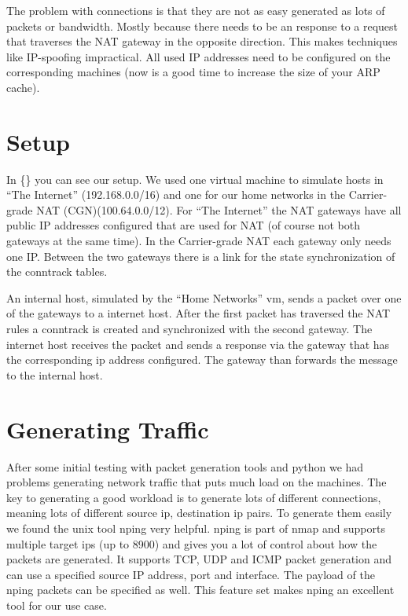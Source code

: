 \documentclass{report}
\begin{document}
The problem with connections is that they are not as easy generated as
lots of packets or bandwidth. Mostly because there needs to be an
response to a request that traverses the NAT gateway in the opposite
direction. This makes techniques like IP-spoofing impractical. All used
IP addresses need to be configured on the corresponding machines (now is
a good time to increase the size of your ARP cache).

\section{Setup}\label{setup-1}

In \{\} you can see our setup. We used one virtual machine to simulate
hosts in ``The Internet'' (192.168.0.0/16) and one for our home networks
in the Carrier-grade NAT (CGN)(100.64.0.0/12). For ``The Internet'' the
NAT gateways have all public IP addresses configured that are used for
NAT (of course not both gateways at the same time). In the Carrier-grade
NAT each gateway only needs one IP. Between the two gateways there is a
link for the state synchronization of the conntrack tables.

An internal host, simulated by the ``Home Networks'' vm, sends a packet
over one of the gateways to a internet host. After the first packet has
traversed the NAT rules a conntrack is created and synchronized with the
second gateway. The internet host receives the packet and sends a
response via the gateway that has the corresponding ip address
configured. The gateway than forwards the message to the internal host.

\section{Generating Traffic}\label{generating-traffic}

After some initial testing with packet generation tools and python we
had problems generating network traffic that puts much load on the
machines. The key to generating a good workload is to generate lots of
different connections, meaning lots of different source ip, destination
ip pairs. To generate them easily we found the unix tool nping\cite{nping}
very helpful. nping is part of nmap\cite{nmap} and supports multiple target
ips (up to 8900) and gives you a lot of control about how the packets
are generated. It supports TCP, UDP and ICMP packet generation and can
use a specified source IP address, port and interface. The payload of
the nping packets can be specified as well. This feature set makes nping
an excellent tool for our use case.
\end{document}
